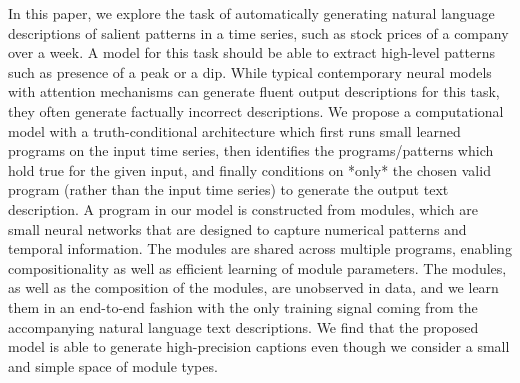 In this paper, we explore the task of automatically generating natural language descriptions of salient patterns in a time series, such as stock prices of a company over a week. A model for this task should be able to extract high-level patterns such as presence of a peak or a dip. While typical contemporary neural models with attention mechanisms can generate fluent output descriptions for this task, they often generate factually incorrect descriptions. We propose a computational model with a truth-conditional architecture which first runs small learned programs on the input time series, then identifies the programs/patterns which hold true for the given input, and finally conditions on *only* the chosen valid program (rather than the input time series) to generate the output text description. A program in our model is constructed from modules, which are small neural networks that are designed to capture numerical patterns and temporal information. The modules are shared across multiple programs, enabling compositionality as well as efficient learning of module parameters. The modules, as well as the composition of the modules, are unobserved in data, and we learn them in an end-to-end fashion with the only training signal coming from the accompanying natural language text descriptions. We find that the proposed model is able to generate high-precision captions even though we consider a small and simple space of module types.
